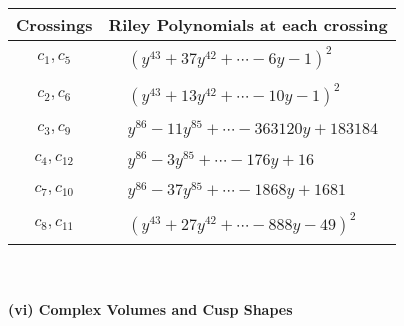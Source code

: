 \documentclass[1p]{elsarticle_modified}
\theoremstyle{definition}
\begin{document}
\begin{tabular}{m{50pt}|m{274pt}}
Crossings & \hspace{64pt}Riley Polynomials at each crossing \\
\hline $$\begin{aligned}c_{1},c_{5}\end{aligned}$$&$\begin{aligned}
&(y^{43}+37 y^{42}+\cdots-6 y-1)^{2}
\end{aligned}$\\
\hline $$\begin{aligned}c_{2},c_{6}\end{aligned}$$&$\begin{aligned}
&(y^{43}+13 y^{42}+\cdots-10 y-1)^{2}
\end{aligned}$\\
\hline $$\begin{aligned}c_{3},c_{9}\end{aligned}$$&$\begin{aligned}
&y^{86}-11 y^{85}+\cdots-363120 y+183184
\end{aligned}$\\
\hline $$\begin{aligned}c_{4},c_{12}\end{aligned}$$&$\begin{aligned}
&y^{86}-3 y^{85}+\cdots-176 y+16
\end{aligned}$\\
\hline $$\begin{aligned}c_{7},c_{10}\end{aligned}$$&$\begin{aligned}
&y^{86}-37 y^{85}+\cdots-1868 y+1681
\end{aligned}$\\
\hline $$\begin{aligned}c_{8},c_{11}\end{aligned}$$&$\begin{aligned}
&(y^{43}+27 y^{42}+\cdots-888 y-49)^{2}
\end{aligned}$\\
\hline
\end{tabular}\\~\\
\newpage\flushleft \textbf{(vi) Complex Volumes and Cusp Shapes}
\end{document}
